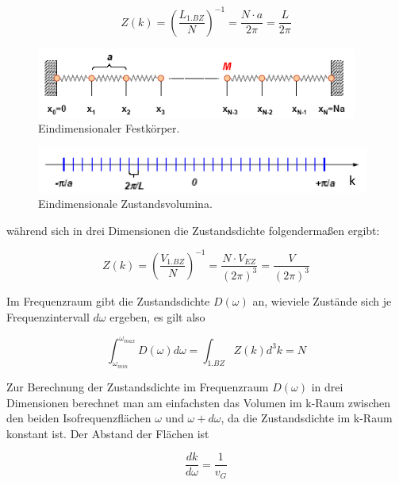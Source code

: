\begin{equation}
    Z(k) = \left( \frac{L_{1.BZ}}{N} \right)^{-1} = \frac{N \cdot a}{2 \pi} = \frac{L}{2 \pi}
\end{equation}

\begin{figure}[H]
    \centering
    \includegraphics[width=.75\textwidth]{resources/31-10-2013/real.png}
    \caption{Eindimensionaler Festkörper.}
    \label{fig:q88:real}
\end{figure}

\begin{figure}[H]
    \centering
    \includegraphics[width=.75\textwidth]{resources/31-10-2013/k.png}
    \caption{Eindimensionale Zustandsvolumina.}
    \label{fig:q88:k}
\end{figure}

während sich in drei Dimensionen die Zustandsdichte folgendermaßen ergibt:

\begin{equation}
    Z(k) = \left( \frac{V_{1.BZ}}{N} \right)^{-1} = \frac{N \cdot V_{EZ}}{(2 \pi)^3} = \frac{V}{(2 \pi)^3}
\end{equation}

Im Frequenzraum gibt die Zustandsdichte $D(\omega)$ an, wieviele Zustände sich je Frequenzintervall $d \omega$ ergeben, es gilt also

\begin{equation}
    \int_{\omega_{min}}^{\omega_{max}} D(\omega) d \omega = \int_{1.BZ} Z(k) d^3 k = N
\end{equation}

Zur Berechnung der Zustandsdichte im Frequenzraum $D(\omega)$ in drei Dimensionen berechnet man am einfachsten das Volumen im k-Raum zwischen den beiden Isofrequenzflächen $\omega$ und $\omega + d \omega$, da die Zustandsdichte im k-Raum konstant ist. Der Abstand der Flächen ist

\begin{equation}
    \frac{d k}{d \omega} = \frac{1}{v_G}
\end{equation}

